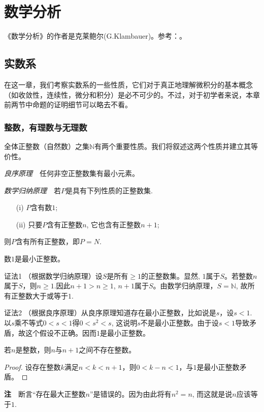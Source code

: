 \part{数学分析}
《数学分析》的作者是克莱鲍尔(G.Klambauer)。参考：\cite{MathematicalAnalysisKlambauer1981}。

\chapter{实数系}\label{ch01001}
在这一章，我们考察实数系的一些性质，它们对于真正地理解微积分的基本概念（如收敛性，连续性，微分和积分）是必不可少的。不过，对于初学者来说，本章前两节中命题的证明细节可以略去不看。

\section{整数，有理数与无理数}\label{sec0100101}
全体正整数（自然数）之集$\mathbb{N}$有两个重要性质。我们将叙述这两个性质并建立其等价性。

\emph{良序原理}\ \ 任何非空正整数集有最小元素。

\emph{数学归纳原理}\ \ 若$P$是具有下列性质的正整数集.
\begin{enumerate}
\item[(i)] $P$含有数$1$;
\item[(ii)] 只要$P$含有正整数$n$, 它也含有正整数$n+1$;
\end{enumerate}
则$P$含有所有正整数，即$P = N$.

\begin{proposition}{}{}
数$1$是最小正整数。
\end{proposition}

证法1 （根据数学归纳原理）设$S$是所有$\ge 1$的正整数集。显然, $1$属于$S$。若整数$n$属于$S$，则$n \ge 1$.因此$n+1 > n \ge 1$, $n+1$属于$S$。由数学归纳原理，$S=\mathbb{N}$, 故所有正整数大于或等于$1$.

证法2 （根据良序原理）从良序原理知道存在最小正整数，比如说是$s$，设$s < 1$. 以$s$乘不等式$0 < s < 1$得$0 < s^2 < s$, 这说明$s$不是最小正整数。由于设$s < 1$导致矛盾，故这个假设不正确。因而$1$是最小正整数。

\begin{corollary}{}{}
若$n$是整数，则$n$与$n+1$之间不存在整数。
\end{corollary}
\begin{proof}
设存在整数$k$满足$n < k < n+1$，则$0 < k-n< 1$，与$1$是最小正整数矛盾。
\end{proof}

\textbf{注}\ \ 断言“存在最大正整数$n$”是错误的。因为由此将有$n^2=n$, 而这就是说$n$应该等于$1$.

